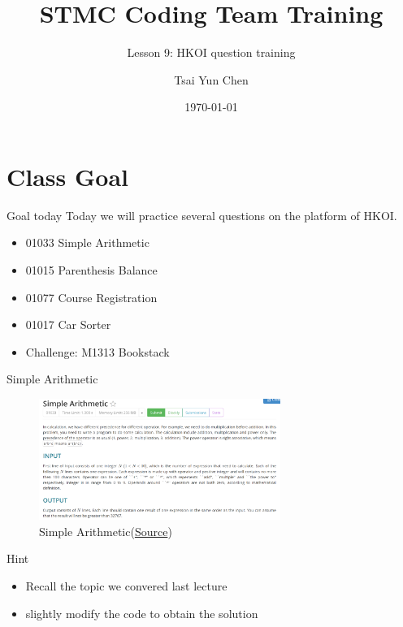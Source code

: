\documentclass[10pt,xcolor={table,dvipsnames},t]{beamer}
\title[Your Short Title]{STMC Coding Team Training}
\subtitle{Lesson 9: HKOI question training}
\author{Tsai Yun Chen}
\date{\today}
\begin{document}
\begin{frame}
  \titlepage
\end{frame}


\section{Class Goal}

\begin{frame}{Goal today}
Today we will practice several questions on the platform of HKOI.
\begin{itemize}
  \item 01033 Simple Arithmetic
  \item 01015 Parenthesis Balance
  \item 01077 Course Registration
  \item 01017 Car Sorter
  \item Challenge: M1313 Bookstack
\end{itemize}
\end{frame}

\begin{frame}{Simple Arithmetic}
  \begin{figure}[h!]
    \includegraphics[width=0.7\textwidth]{Q1.png}
    \caption{Simple Arithmetic(\href{https://judge.hkoi.org/task/01033}{Source})}
  \end{figure}
\end{frame}

\begin{frame}{Hint}
  \begin{itemize}
    \item Recall the topic we convered last lecture
    \item slightly modify the code to obtain the solution
  \end{itemize}
\end{frame}
\end{document}
